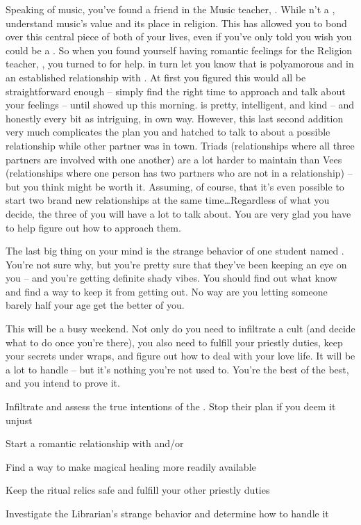 \documentclass[char]{GL2020}
\begin{document}
Speaking of music, you’ve found a friend in the Music teacher, \cMusic{}. While \cMusic{\they} \cMusic{\are}n’t a \cMusic{\cleric} \cMusic{\themself}, \cMusic{\they} understand\cMusic{\plural} music’s value and its place in religion.  This has allowed you to bond over this central piece of both of your lives, even if you’ve only told \cMusic{\them} you wish you could be a \cInterpol{\cleric}. So when you found yourself having romantic feelings for the Religion teacher, \cBeetle{}, you turned to \cMusic{} for help. \cMusic{} in turn let you know that \cBeetle{} is polyamorous and in an established relationship with \cJuniorStatesman{}. At first you figured this would all be straightforward enough -- simply find the right time to approach \cBeetle{} and talk about your feelings -- until \cJuniorStatesman{} showed up this morning. \cJuniorStatesman{} is pretty, intelligent, and kind -- and honestly every bit as intriguing, in \cJuniorStatesman{\their} own way. However, this last second addition very much complicates the plan you and \cMusic{} hatched to talk to \cBeetle{} about a possible relationship while \cBeetle{\their} other partner was in town. Triads (relationships where all three partners are involved with one another) are a lot harder to maintain than Vees (relationships where one person has two partners who are not in a relationship) -- but you think \cJuniorStatesman{} might be worth it. Assuming, of course, that it’s even possible to start two brand new relationships at the same time\ldots Regardless of what you decide, the three of you will have a lot to talk about. You are very glad you have \cMusic{} to help figure out how to approach them.

The last big thing on your mind is the strange behavior of one \cFarm{} student named \cLibAssist{}. You’re not sure why, but you’re pretty sure that they’ve been keeping an eye on you -- and you’re getting definite shady vibes. You should find out what \cLibAssist{\they} know\cLibAssist{\plural} and find a way to keep it from getting out. No way are you letting someone barely half your age get the better of you.

This will be a busy weekend. Not only do you need to infiltrate a cult (and decide what to do once you’re there), you also need to fulfill your priestly duties, keep your secrets under wraps, and figure out how to deal with your love life. It will be a lot to handle -- but it’s nothing you’re not used to. You’re the best of the best, and you intend to prove it.


\begin{itemz}[Goals]
	\item Infiltrate and assess the true intentions of the \pGoaties{}. Stop their plan if you deem it unjust
	\item Start a romantic relationship with \cBeetle{} and/or \cJuniorStatesman{}
	\item Find a way to make magical healing more readily available
	\item Keep the ritual relics safe and fulfill your other priestly duties
\item Investigate the Librarian’s strange behavior and determine how to handle it
\end{itemz}
\end{document}
